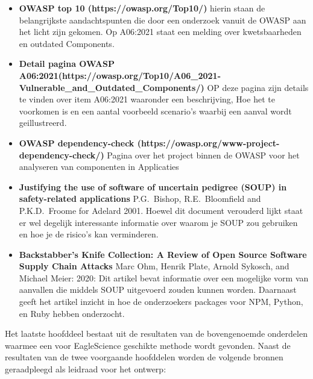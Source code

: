 \begin{itemize}
    \item \textbf{OWASP top 10 (https://owasp.org/Top10/)} hierin staan de belangrijkste aandachtspunten die door een onderzoek vanuit de OWASP aan het licht zijn gekomen. Op A06:2021 staat een melding over kwetsbaarheden en outdated Components.
    \item \textbf{Detail pagina OWASP A06:2021(https://owasp.org/Top10/A06\_2021-Vulnerable\_and\_Outdated\_Components/)} OP deze pagina zijn details te vinden over item A06:2021 waaronder een beschrijving, Hoe het te voorkomen is en een aantal voorbeeld scenario's waarbij een aanval wordt geillustreerd.
    \item \textbf{OWASP dependency-check (https://owasp.org/www-project-dependency-check/)} Pagina over het project binnen de OWASP voor het analyseren van componenten in Applicaties
    \item \textbf{Justifying the use of software of uncertain pedigree (SOUP) in safety-related applications} P.G.\ Bishop, R.E.\ Bloomfield and P.K.D.\  Froome for Adelard 2001. Hoewel dit document verouderd lijkt staat er wel degelijk interessante informatie over waarom je SOUP zou gebruiken en hoe je de risico's kan verminderen.
    \item \textbf{Backstabber’s Knife Collection: A Review of Open Source Software Supply Chain Attacks} Marc Ohm, Henrik Plate, Arnold Sykosch, and Michael Meier: 2020: Dit artikel bevat informatie over een mogelijke vorm van aanvallen die middels SOUP uitgevoerd zouden kunnen worden. Daarnaast geeft het artikel inzicht in hoe de onderzoekers packages voor NPM, Python, en Ruby hebben onderzocht.
\end{itemize}
Het laatste hoofddeel bestaat uit de resultaten van de bovengenoemde onderdelen waarmee een voor EagleScience geschikte methode wordt gevonden. Naast de resultaten van de twee voorgaande hoofddelen worden de volgende bronnen geraadpleegd als leidraad voor het ontwerp:


